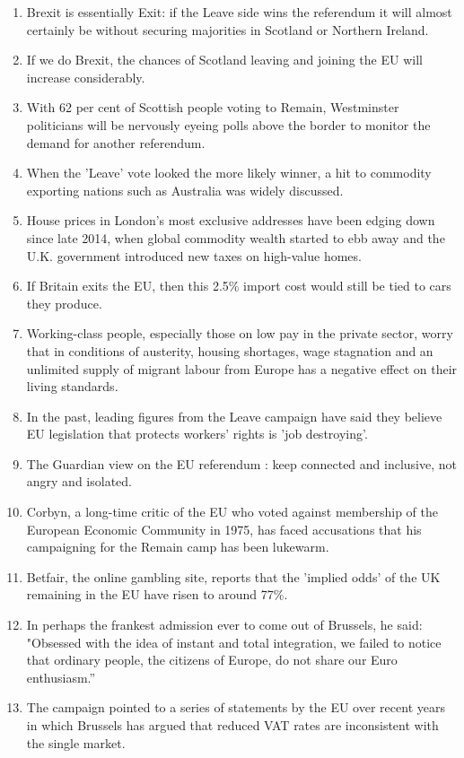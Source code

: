 \documentclass[fleqn,moreauthors,10pt]{ds_report}
\begin{document}
\begin{enumerate}
    \item Brexit is essentially Exit: if the Leave side wins the referendum it will almost certainly be without securing majorities in Scotland or Northern Ireland.
    \item If we do Brexit, the chances of Scotland leaving and joining the EU will increase considerably.
    \item With 62 per cent of Scottish people voting to Remain, Westminster politicians will be nervously eyeing polls above the border to monitor the demand for another referendum.
    \item When the 'Leave' vote looked the more likely winner, a hit to commodity exporting nations such as Australia was widely discussed.
    \item House prices in London's most exclusive addresses have been edging down since late 2014, when global commodity wealth started to ebb away and the U.K. government introduced new taxes on high-value homes.
    \item If Britain exits the EU, then this 2.5\% import cost would still be tied to cars they produce.
    \item Working-class people, especially those on low pay in the private sector, worry that in conditions of austerity, housing shortages, wage stagnation and an unlimited supply of migrant labour from Europe has a negative effect on their living standards.
    \item In the past, leading figures from the Leave campaign have said they believe EU legislation that protects workers' rights is 'job destroying'.
    \item The Guardian view on the EU referendum : keep connected and inclusive, not angry and isolated.
    \item Corbyn, a long-time critic of the EU who voted against membership of the European Economic Community in 1975, has faced accusations that his campaigning for the Remain camp has been lukewarm.
    \item Betfair, the online gambling site, reports that the 'implied odds' of the UK remaining in the EU have risen to around 77\%.
    \item In perhaps the frankest admission ever to come out of Brussels, he said: "Obsessed with the idea of instant and total integration, we failed to notice that ordinary people, the citizens of Europe, do not share our Euro enthusiasm.”
    \item The campaign pointed to a series of statements by the EU over recent years in which Brussels has argued that reduced VAT rates are inconsistent with the single market.

\end{enumerate}
\end{document}
